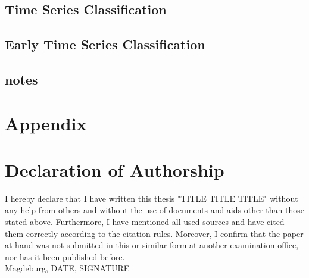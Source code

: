 \subsection{Time Series Classification}

\subsection{Early Time Series Classification}

\subsection{notes}




\null\newpage


\section{Appendix}

\null\newpage

% 
\printbibliography

\newpage

\section{Declaration of Authorship}
I hereby declare that I have written this thesis "TITLE TITLE TITLE"
without any help from others and without the use of documents and aids
other than those stated above. Furthermore, I have mentioned all used
sources and have cited them correctly according to the citation rules.
Moreover, I confirm that the paper at hand was not submitted in this or
similar form at another examination office, nor has it been published
before.
\\
Magdeburg, DATE, SIGNATURE